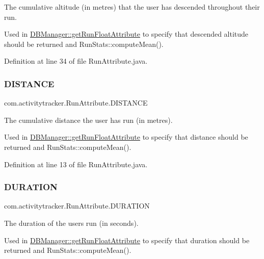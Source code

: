 The cumulative altitude (in metres) that the user has descended throughout their run.

Used in \mbox{\hyperlink{classcom_1_1activitytracker_1_1_d_b_manager_a666452f1e5862f90c06b0beb9a9fcfdd}{D\+B\+Manager\+::get\+Run\+Float\+Attribute}} to specify that descended altitude should be returned and Run\+Stats\+::compute\+Mean(). 

Definition at line 34 of file Run\+Attribute.\+java.

\mbox{\label{enumcom_1_1activitytracker_1_1_run_attribute_a90ee541e68e458a0bb3f5ea45fd46ec0}} 
\subsubsection{\texorpdfstring{DISTANCE}{DISTANCE}}
{\footnotesize\ttfamily com.\+activitytracker.\+Run\+Attribute.\+D\+I\+S\+T\+A\+N\+CE}

The cumulative distance the user has run (in metres).

Used in \mbox{\hyperlink{classcom_1_1activitytracker_1_1_d_b_manager_a666452f1e5862f90c06b0beb9a9fcfdd}{D\+B\+Manager\+::get\+Run\+Float\+Attribute}} to specify that distance should be returned and Run\+Stats\+::compute\+Mean(). 

Definition at line 13 of file Run\+Attribute.\+java.

\mbox{\label{enumcom_1_1activitytracker_1_1_run_attribute_a7adf133b2a62f1f99ffc2adfb7097ec9}} 
\subsubsection{\texorpdfstring{DURATION}{DURATION}}
{\footnotesize\ttfamily com.\+activitytracker.\+Run\+Attribute.\+D\+U\+R\+A\+T\+I\+ON}

The duration of the user\textquotesingle{}s run (in seconds).

Used in \mbox{\hyperlink{classcom_1_1activitytracker_1_1_d_b_manager_a666452f1e5862f90c06b0beb9a9fcfdd}{D\+B\+Manager\+::get\+Run\+Float\+Attribute}} to specify that duration should be returned and Run\+Stats\+::compute\+Mean(). 

